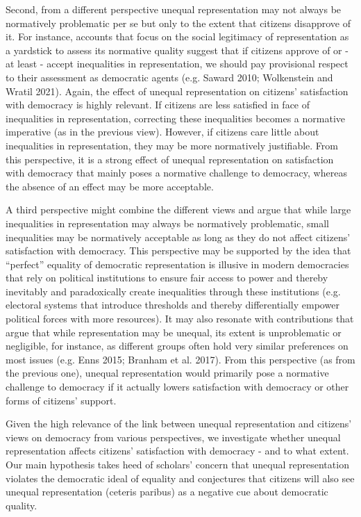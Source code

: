 \documentclass[12pt, letterpaper]{article}
\begin{document}
\begin{spacing}{1.5}
Second, from a different perspective unequal representation may not always be normatively problematic per se but only to the extent that citizens disapprove of it. For instance, accounts that focus on the social legitimacy of representation as a yardstick to assess its normative quality suggest that if citizens approve of or - at least - accept inequalities in representation, we should pay provisional respect to their assessment as democratic agents (e.g. Saward 2010; Wolkenstein and Wratil 2021). Again, the effect of unequal representation on citizens' satisfaction with democracy is highly relevant. If citizens are less satisfied in face of inequalities in representation, correcting these inequalities becomes a normative imperative (as in the previous view). However, if citizens care little about inequalities in representation, they may be more normatively justifiable. From this perspective, it is a strong effect of unequal representation on satisfaction with democracy that mainly poses a normative challenge to democracy, whereas the absence of an effect may be more acceptable.

A third perspective might combine the different views and argue that while large inequalities in representation may always be normatively problematic, small inequalities may be normatively acceptable as long as they do not affect citizens' satisfaction with democracy. This perspective may be supported by the idea that “perfect” equality of democratic representation is illusive in modern democracies that rely on political institutions to ensure fair access to power and thereby inevitably and paradoxically create inequalities through these institutions (e.g. electoral systems that introduce thresholds and thereby differentially empower political forces with more resources). It may also resonate with contributions that argue that while representation may be unequal, its extent is unproblematic or negligible, for instance, as different groups often hold very similar preferences on most issues (e.g. Enns 2015; Branham et al. 2017). From this perspective (as from the previous one), unequal representation would primarily pose a normative challenge to democracy if it actually lowers satisfaction with democracy or other forms of citizens' support.

Given the high relevance of the link between unequal representation and citizens' views on democracy from various perspectives, we investigate whether unequal representation affects citizens' satisfaction with democracy - and to what extent. Our main hypothesis takes heed of scholars' concern that unequal representation violates the democratic ideal of equality and conjectures that citizens will also see unequal representation (ceteris paribus) as a negative cue about democratic quality. \\


\end{spacing}
\end{document}
